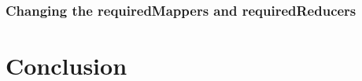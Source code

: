 \subsection{Changing the requiredMappers and requiredReducers}

\chapter{Conclusion}
\label{conlusion}


